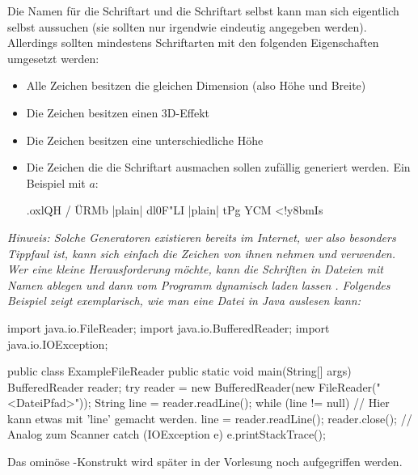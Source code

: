 \documentclass[table]{sopra-base}
\begin{document}
Die Namen für die Schriftart und die Schriftart selbst kann man sich eigentlich selbst aussuchen (sie sollten nur irgendwie eindeutig
angegeben werden). Allerdings sollten mindestens Schriftarten mit den folgenden Eigenschaften umgesetzt werden:
\begin{itemize}[nolistsep]
    \item Alle Zeichen besitzen die gleichen Dimension (also Höhe und Breite)
    \item Die Zeichen besitzen einen 3D-Effekt
    \item Die Zeichen besitzen eine unterschiedliche Höhe
    \item Die Zeichen die die Schriftart ausmachen sollen zufällig generiert werden. Ein Beispiel mit $a$:
\begin{plainjava}
 .oxlQH
/   ÜRMb
|plain| dl0F"LI  |plain|
tPg  YCM
 <!y8bmIs
\end{plainjava}
\end{itemize}
\textit{Hinweis: Solche Generatoren existieren bereits im Internet, wer also besonders Tippfaul ist, kann sich einfach die Zeichen von ihnen nehmen und verwenden. Wer eine kleine Herausforderung möchte, kann die Schriften in Dateien mit Namen  ablegen und dann vom Programm dynamisch laden lassen \Winkey. Folgendes Beispiel zeigt exemplarisch, wie man eine Datei in Java auslesen kann:}
\begin{java}
import java.io.FileReader;
import java.io.BufferedReader;
import java.io.IOException;

public class ExampleFileReader {
    public static void main(String[] args) {
        BufferedReader reader;
        try {
            reader = new BufferedReader(new FileReader("<DateiPfad>"));
            String line = reader.readLine();
            while (line != null) {
                // Hier kann etwas mit 'line' gemacht werden.
                line = reader.readLine();
            }
            reader.close(); // Analog zum Scanner
        } catch (IOException e) {
            e.printStackTrace();
        }
    }
}
\end{java}
Das ominöse -Konstrukt wird später in der Vorlesung noch aufgegriffen werden.
\end{document}
